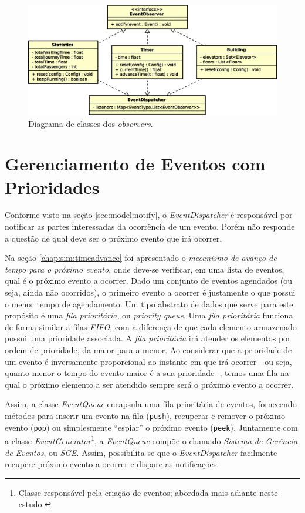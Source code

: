 \begin{figure}[htb!]
  \centering
  \includegraphics[scale=0.6]{img/Observers.eps}
  \caption{Diagrama de classes dos \textit{observers}.}
\label{fig:diagram:observers}
\end{figure}

\section{Gerenciamento de Eventos com Prioridades}

Conforme visto na seção \ref{sec:model:notify}, o \textit{EventDispatcher} é
responsável por notificar as partes interessadas da ocorrência de um evento.
Porém não responde a questão de qual deve ser o próximo evento que irá ocorrer.

Na seção \ref{chap:sim:timeadvance} foi apresentado o \textit{mecanismo de
avanço de tempo para o próximo evento}, onde deve-se verificar, em uma lista de
eventos, qual é o próximo evento a ocorrer. Dado um conjunto de eventos
agendados (ou seja, ainda não ocorridos), o primeiro evento a ocorrer é
justamente o que possui o menor tempo de agendamento. Um tipo abstrato de dados
que serve para este propósito é uma \textit{fila prioritária}, ou
\textit{priority queue}. Uma \textit{fila prioritária} funciona de forma similar
a filas \textit{FIFO}, com a diferença de que cada elemento armazenado possui
uma prioridade associada. A \textit{fila prioritária} irá atender os elementos
por ordem de prioridade, da maior para a menor. Ao considerar que a prioridade
de um evento é inversamente proporcional ao instante em que irá ocorrer - ou
seja, quanto menor o tempo do evento maior é a sua prioridade -, temos uma fila
na qual o próximo elemento a ser atendido sempre será o próximo evento a
ocorrer.

Assim, a classe \textit{EventQueue} encapsula uma fila prioritária de eventos,
fornecendo métodos para inserir um evento na fila (\texttt{push}), recuperar e
remover o próximo evento (\texttt{pop}) ou simplesmente ``espiar'' o próximo
evento (\texttt{peek}). Juntamente com a classe
\textit{EventGenerator}\footnote{Classe responsável pela criação de eventos;
abordada mais adiante neste estudo.}, a \textit{EventQueue} compõe o chamado
\textit{Sistema de Gerência de Eventos}, ou \textit{SGE}. Assim, possibilita-se
que o \textit{EventDispatcher} facilmente recupere próximo evento a ocorrer e
dispare as notificações.

